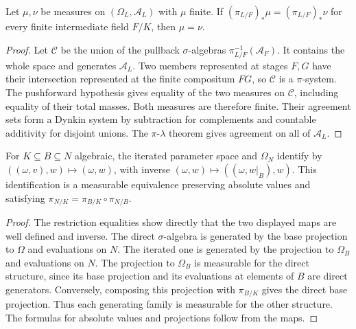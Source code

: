 \begin{lemma}\label{lem:algebraic-total-measure-uniqueness}
\leanok
{}
Let $\mu,\nu$ be measures on $(\Omega_L,\mathcal A_L)$ with $\mu$
finite. If $(\pi_{L/F})_*\mu=(\pi_{L/F})_*\nu$ for every finite
intermediate field $F/K$, then $\mu=\nu$.
\end{lemma}
\begin{proof}
Let $\mathcal C$ be the union of the pullback $\sigma$-algebras
$\pi_{L/F}^{-1}(\mathcal A_F)$. It contains the whole space and
generates $\mathcal A_L$. Two members represented at stages $F,G$
have their intersection represented at the finite compositum $FG$,
so $\mathcal C$ is a $\pi$-system. The pushforward hypothesis gives
equality of the two measures on $\mathcal C$, including equality of
their total masses. Both measures are therefore finite. Their
agreement sets form a Dynkin system by subtraction for complements
and countable additivity for disjoint unions. The $\pi$-$\lambda$
theorem gives agreement on all of $\mathcal A_L$.
\end{proof}

\begin{lemma}\label{lem:algebraic-tower-spaces}
\leanok
{}
For $K\subseteq B\subseteq N$ algebraic, the iterated parameter
space and $\Omega_N$ identify by
$((\omega,v),w)\mapsto(\omega,w)$, with inverse
$(\omega,w)\mapsto((\omega,w|_B),w)$. This identification is a
measurable equivalence preserving absolute values and satisfying
$\pi_{N/K}=\pi_{B/K}\circ\pi_{N/B}$.
\end{lemma}
\begin{proof}
The restriction equalities show directly that the two displayed maps
are well defined and inverse. The direct $\sigma$-algebra is
generated by the base projection to $\Omega$ and evaluations on $N$.
The iterated one is generated by the projection to $\Omega_B$ and
evaluations on $N$. The projection to $\Omega_B$ is measurable for
the direct structure, since its base projection and its evaluations
at elements of $B$ are direct generators. Conversely, composing this
projection with $\pi_{B/K}$ gives the direct base projection.
Thus each generating family is measurable for the other structure.
The formulas for absolute values and projections follow from the maps.
\end{proof}

